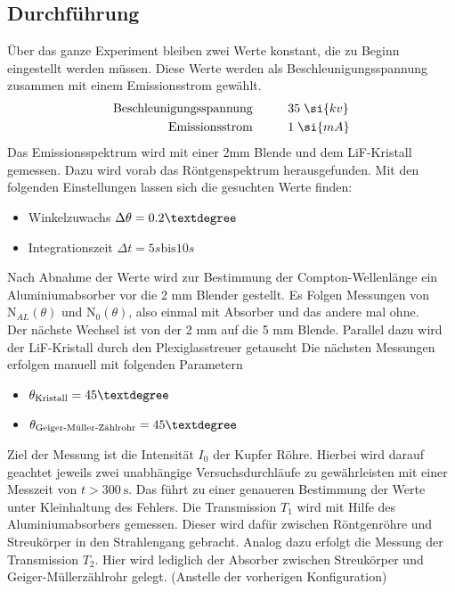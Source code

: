 \subsection{Durchführung}
Über das ganze Experiment bleiben zwei Werte konstant, die zu Beginn eingestellt werden müssen.
Diese Werte werden als Beschleunigungsspannung zusammen mit einem Emissionsstrom gewählt. 
\begin{align*}
\text{Beschleunigungsspannung} &  \hspace{1 cm} 35 \hspace{0.1 cm}\si{kv} \\
\text{Emissionsstrom} &  \hspace{1 cm}   1 \hspace{0.1 cm} \si{mA}\\
\end{align*}
Das Emissionsspektrum wird mit einer 2mm Blende und dem LiF-Kristall gemessen. 
Dazu wird vorab das Röntgenspektrum herausgefunden. Mit den folgenden Einstellungen lassen sich die gesuchten Werte finden:
\begin{itemize}
\item{Winkelzuwachs $\Delta \theta = 0.2 \textdegree$}
\item{Integrationszeit $\Delta t = 5 \si{s} \text{bis} 10 \si{s}$}
\end{itemize}
Nach Abnahme der Werte wird zur Bestimmung der Compton-Wellenlänge ein Aluminiumabsorber vor die 2 mm Blender gestellt.
Es Folgen Messungen von $\text{N}_{AL}(\theta)$ und $\text{N}_{0}(\theta)$, also einmal mit Absorber und das andere mal ohne.
\\
\newline
Der nächste Wechsel ist von der 2 mm auf die 5 mm Blende. Parallel dazu wird der LiF-Kristall durch den Plexiglasstreuer getauscht
Die nächsten Messungen erfolgen manuell mit folgenden Parametern
\begin{itemize}
\item{$\theta_{\text{Kristall}}  = 45 \textdegree$}
\item{$\theta_{\text{Geiger-Müller-Zählrohr}}  = 45 \textdegree$}
\end{itemize}
Ziel der Messung ist die Intensität $I_0$ der Kupfer Röhre.
Hierbei wird darauf geachtet jeweils zwei unabhängige Versuchsdurchläufe zu gewährleisten mit einer Messzeit von $t > \SI{300}{\second}$.
Das führt zu einer genaueren Bestimmung der Werte unter Kleinhaltung des Fehlers.
Die Transmission $T_1$ wird mit Hilfe des Aluminiumabsorbers gemessen. Dieser wird dafür zwischen Röntgenröhre und Streukörper in den Strahlengang
gebracht. Analog dazu erfolgt die Messung der Transmission $T_2$. Hier wird lediglich der Absorber zwischen Streukörper und Geiger-Müllerzählrohr gelegt. (Anstelle der vorherigen Konfiguration)